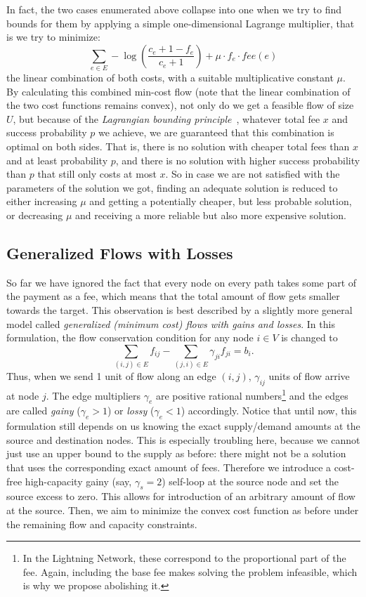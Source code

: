 \documentclass[10pt,twocolumn]{article}
\begin{document}
In fact, the two cases enumerated above collapse into one when we try to find bounds for them by applying a simple one-dimensional Lagrange multiplier, that is we try to minimize:
\[
\sum_{e\in E}-\log(\frac{c_{e}+1-f_e}{c_{e}+1})+\mu\cdot f_e\cdot fee(e)
\]
the linear combination of both costs, with a suitable multiplicative constant
$\mu$.
By calculating this combined min-cost flow (note that the linear combination of
the two cost functions remains convex), not only do we get a feasible flow of size $U$, but because of the \emph{Lagrangian bounding principle}~\cite[p. 605f]{ahuja1993network}, whatever total fee $x$ and success probability $p$ we achieve, we are guaranteed that this combination is optimal on both sides.
That is, there is no solution with cheaper total fees than $x$ and at least probability $p$, and there is no solution with higher success probability than $p$ that still only costs at most $x$.
So in case we are not satisfied with the parameters of the solution we got, finding an adequate solution is reduced to either increasing $\mu$ and getting a potentially cheaper, but less probable solution, or decreasing $\mu$ and receiving a more reliable but also more expensive solution.

\subsection{Generalized Flows with Losses}
\label{generalized}
So far we have ignored the fact that every node on every path takes some part of the payment as a fee, which means that the total amount of flow gets smaller towards the target.
This observation is best described by a slightly more general model called \emph{generalized (minimum cost) flows with gains and losses}. In this formulation, the flow conservation condition for any node $i\in V$ is changed to $$\sum_{(i,j)\in E} f_{ij} - \sum_{(j,i)\in E} \gamma_{ji}f_{ji} = b_i.$$
Thus, when we send 1 unit of flow along an edge $(i,j)$, $\gamma_{ij}$ units of flow arrive at node $j$. The edge multipliers $\gamma_e$ are positive rational numbers\footnote{In the Lightning Network, these correspond to the proportional part of the fee. Again, including the base fee makes solving the problem infeasible, which is why we propose abolishing it.} and the edges are called \emph{gainy} ($\gamma_e > 1$) or \emph{lossy} ($\gamma_e < 1$) accordingly.
Notice that until now, this formulation still depends on us knowing the exact supply/demand amounts at the source and destination nodes. This is especially troubling here, because we cannot just use an upper bound to the supply as before: there might not be a solution that uses the corresponding exact amount of fees. Therefore we introduce a cost-free high-capacity gainy (say, $\gamma_s=2$) self-loop at the source node and set the source excess to zero. This allows for introduction of an arbitrary amount of flow at the source. Then, we aim to minimize the convex cost function as before under the remaining flow and capacity constraints.
\end{document}
